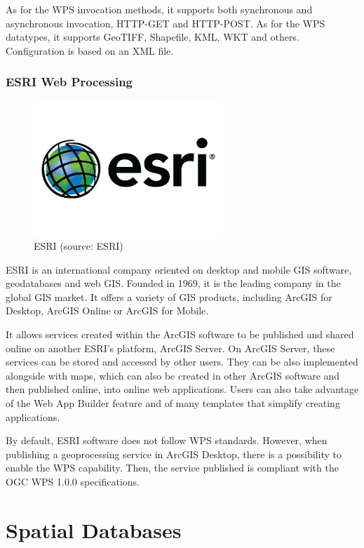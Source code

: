 As for the WPS invocation methods, it supports both synchronous and
asynchronous invocation, HTTP-GET and HTTP-POST. As for the WPS
datatypes, it supports GeoTIFF, Shapefile, KML, WKT and
others.\cite{north} Configuration is based on an XML file.
  

\subsubsection{ESRI Web Processing}

\begin{figure}[H] \centering
      \includegraphics[width=200pt]{./pictures/esri.png}
      \caption[ESRI logo]{ESRI (source: ESRI)}
      \label{fig:ESRI}
  \end{figure}

ESRI is an international company oriented on desktop and mobile GIS
software, geodatabases and web GIS. Founded in 1969, it is the leading
company in the global GIS market. It offers a variety of GIS products,
including ArcGIS for Desktop, ArcGIS Online or ArcGIS for Mobile.

It allows services created within the ArcGIS software to be published
and shared online on another ESRI's platform, ArcGIS Server. On ArcGIS
Server, these services can be stored and accessed by other users. They
can be also implemented alongside with maps, which can also be created
in other ArcGIS software and then published online, into online web
applications. Users can also take advantage of the Web App Builder
feature and of many templates that simplify creating applications.

By default, ESRI software does not follow WPS standards. However, when
publishing a geoprocessing service in ArcGIS Desktop, there is a
possibility to enable the WPS capability. Then, the service published
is compliant with the OGC WPS 1.0.0 specifications.\cite{arcgiswps}

\section{Spatial Databases}

